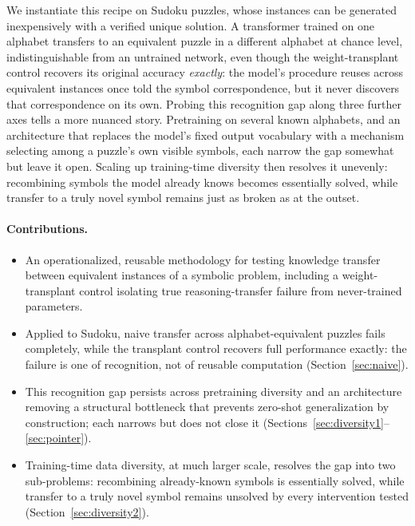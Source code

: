 \documentclass{article} %
\begin{document}
We instantiate this recipe on Sudoku puzzles, whose instances can be
generated inexpensively with a verified unique solution. A transformer
trained on one alphabet transfers to an equivalent puzzle in a different
alphabet at chance level, indistinguishable from an untrained network,
even though the weight-transplant control recovers its original accuracy
\emph{exactly}: the model's procedure reuses across equivalent instances
once told the symbol correspondence, but it never discovers that
correspondence on its own. Probing this recognition gap along three
further axes tells a more nuanced story. Pretraining on several known
alphabets, and an architecture that replaces the model's fixed output
vocabulary with a mechanism selecting among a puzzle's own visible
symbols, each narrow the gap somewhat but leave it open. Scaling up
training-time diversity then resolves it unevenly: recombining symbols
the model already knows becomes essentially solved, while transfer to a
truly novel symbol remains just as broken as at the outset.

\paragraph{Contributions.}
\begin{itemize}
  \item An operationalized, reusable methodology for testing knowledge
  transfer between equivalent instances of a symbolic problem, including
  a weight-transplant control isolating true reasoning-transfer failure
  from never-trained parameters.
  \item Applied to Sudoku, naive transfer across alphabet-equivalent
  puzzles fails completely, while the transplant control recovers full
  performance exactly: the failure is one of recognition, not of
  reusable computation (Section~\ref{sec:naive}).
  \item This recognition gap persists across pretraining diversity and an
  architecture removing a structural bottleneck that prevents zero-shot
  generalization by construction; each narrows but does not close it
  (Sections~\ref{sec:diversity1}--\ref{sec:pointer}).
  \item Training-time data diversity, at much larger scale, resolves the
  gap into two sub-problems: recombining already-known symbols is
  essentially solved, while transfer to a truly novel symbol remains
  unsolved by every intervention tested (Section~\ref{sec:diversity2}).
\end{itemize}
\end{document}
